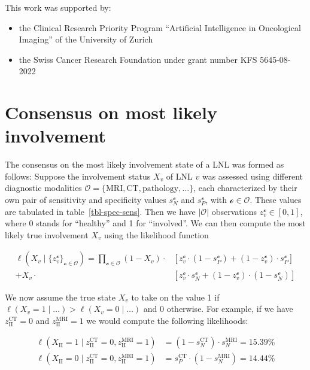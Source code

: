 \documentclass[
  sn-mathphys-num,
]{sn-jnl}
\providecommand{\tightlist}{%
  \setlength{\itemsep}{0pt}\setlength{\parskip}{0pt}}\usepackage{longtable,booktabs,array}
\begin{document}
This work was supported by:

\begin{itemize}
\tightlist
\item
  the Clinical Research Priority Program ``Artificial Intelligence in
  Oncological Imaging'' of the University of Zurich
\item
  the Swiss Cancer Research Foundation under grant number KFS
  5645-08-2022
\end{itemize}

\section{Consensus on most likely involvement}\label{sec-consensus}

The consensus on the most likely involvement state of a LNL was formed
as follows: Suppose the involvement status \(X_v\) of LNL \(v\) was
assessed using different diagnostic modalities
\(\mathcal{O} = \{ \text{MRI}, \text{CT}, \text{pathology}, \ldots \}\),
each characterized by their own pair of sensitivity and specificity
values \(s_N^{\mathcal{o}}\) and \(s_P^{\mathcal{o}}\), with
\(\mathcal{o} \in \mathcal{O}\). These values are tabulated in
table~\ref{tbl-spec-sens}. Then we have \(|\mathcal{O}|\) observations
\(z_v^{\mathcal{o}} \in \left[ 0, 1 \right]\), where 0 stands for
``healthy'' and 1 for ``involved''. We can then compute the most likely
true involvement \(X_v\) using the likelihood function

\[
\begin{aligned}
\ell \left( X_v \mid \{ z_v^{\mathcal{o}} \}_{\mathcal{o} \in \mathcal{O}} \right) = \prod_{\mathcal{o} \in \mathcal{O}}
\left( 1 - X_v \right) \cdot &\left[ z_v^{\mathcal{o}} \cdot \left( 1 - s_P^{\mathcal{o}} \right) + \left( 1 - z_v^{\mathcal{o}} \right) \cdot s_P^{\mathcal{o}} \right] \\
+ X_v \cdot &\left[ z_v^{\mathcal{o}} \cdot s_N^{\mathcal{o}} + \left( 1 - z_v^{\mathcal{o}} \right) \cdot (1 - s_N^{\mathcal{o}}) \right]
\end{aligned}
\]

We now assume the true state \(X_v\) to take on the value 1 if
\(\ell \left( X_v = 1 \mid \ldots \right) > \ell \left( X_v = 0 \mid \ldots \right)\)
and 0 otherwise. For example, if we have \(z_\text{II}^\text{CT} = 0\)
and \(z_\text{II}^\text{MRI} = 1\) we would compute the following
likelihoods:

\[
\begin{aligned}
\ell \left( X_\text{II} = 1 \mid z_\text{II}^\text{CT} = 0, z_\text{II}^\text{MRI} = 1 \right) &= \left( 1 - s_N^\text{CT} \right) \cdot s_N^\text{MRI} = 15.39\% \\
\ell \left( X_\text{II} = 0 \mid z_\text{II}^\text{CT} = 0, z_\text{II}^\text{MRI} = 1 \right) &= s_P^\text{CT} \cdot \left(1 - s_N^\text{MRI}\right) = 14.44\%
\end{aligned}
\]
\end{document}
